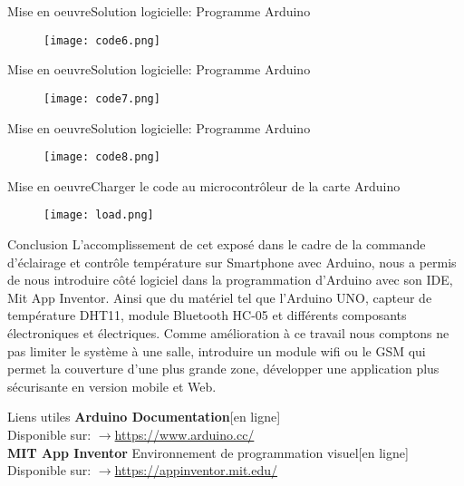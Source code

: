\documentclass{beamer}
\begin{document}
\begin{frame}{Mise en oeuvre}{Solution logicielle: Programme Arduino}
	\begin{figure}\centering
		\texttt{[image: code6.png]}
	\end{figure}	
\end{frame}

\begin{frame}{Mise en oeuvre}{Solution logicielle: Programme Arduino}
	\begin{figure}\centering
		\texttt{[image: code7.png]}
	\end{figure}	
\end{frame}

\begin{frame}{Mise en oeuvre}{Solution logicielle: Programme Arduino}
	\begin{figure}\centering
		\texttt{[image: code8.png]}
	\end{figure}	
\end{frame}

\begin{frame}{Mise en oeuvre}{Charger le code au microcontrôleur de la carte Arduino}
	\begin{figure}\centering
		\texttt{[image: load.png]}
	\end{figure}	
\end{frame}
	


\begin{frame}{Conclusion}
L'accomplissement de cet exposé dans le cadre de la commande d'éclairage et contrôle température sur Smartphone avec Arduino, nous a permis de nous introduire côté logiciel dans la programmation d'Arduino avec son IDE, Mit App Inventor. Ainsi que du matériel tel que l’Arduino UNO, capteur de température DHT11, module Bluetooth HC-05 et différents composants électroniques et électriques.
Comme amélioration à ce travail nous comptons ne pas limiter le système à une salle, introduire un module wifi ou le GSM qui permet la couverture d'une plus grande zone, développer une application plus sécurisante en version mobile et Web.
\end{frame}

\begin{frame}{Liens utiles}
	\textbf{Arduino Documentation}[en ligne]\\
	Disponible sur: $\rightarrow{}$\textcolor{blue}{\url{https://www.arduino.cc/}}\\
	\vspace{10pt}
	\textbf{MIT App Inventor} Environnement de programmation visuel[en ligne] \\
	Disponible sur: $\rightarrow{}$\textcolor{blue}{\url{https://appinventor.mit.edu/}}
\end{frame}
	
\end{document}
